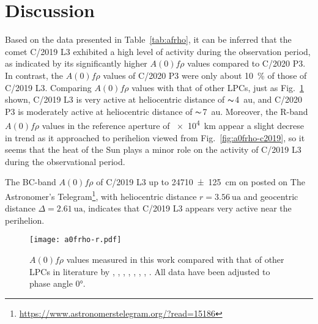 \section{Discussion}\label{sec:dis}


Based on the data presented in Table~\ref{tab:afrho}, it can be inferred that the comet C/2019 L3 exhibited a high level of activity during the observation period, as indicated by its significantly higher $A(0)f\rho$ values compared to C/2020 P3. In contrast, the $A(0)f\rho$ values of C/2020 P3 were only about \SI{10}{\percent} of those of C/2019 L3. 
Comparing $A(0)f\rho$ values with that of other LPCs, just as Fig.~\ref{fig:afrho-ref} shown, C/2019 L3 is very active at heliocentric distance of $\thicksim${\SI{4}{\astronomicalunit}}, and C/2020 P3 is moderately active at heliocentric distance of $\thicksim${\SI{7}{\astronomicalunit}}. 
Moreover, the R-band $A(0)f\rho$ values in the reference aperture of {\SI{e4}{\km}} appear a slight decrese in trend as it approached to perihelion viewed from Fig.~\ref{fig:a0frho-c2019}, so it seems that the heat of the Sun plays a minor role on the activity of C/2019 L3 during the observational period. %

The BC-band $A(0)f\rho$ of C/2019 L3 up to \SI{24710 +- 125}{\cm} on  posted on The Astronomer's Telegram\footnote{\href{https://www.astronomerstelegram.org/?read=15186}{https://www.astronomerstelegram.org/?read=15186}}, with heliocentric distance $r = \SI{3.56}{\astronomicalunit}$ and geocentric distance $\Delta = \SI{2.61}{\astronomicalunit}$, indicates that C/2019 L3 appears very active near the perihelion. 


\begin{figure}
    \centering
    \texttt{[image: a0frho-r.pdf]}
    \caption{$A(0)f\rho$ values measured in this work compared with that of other LPCs in  literature by \citet{mazzotta_epifani_observational_2014}, \citet{garcia_photometry_2021}, \citet{garcia_observational_2020}, \citet{rousselot_monitoring_2014}, \citet{meech_activity_2009}, \citet{sarneczky_activity_2016}, \citet{solontoi_ensemble_2012}, \citet{szabo_spectrophotometry_2002}. All data have been adjusted to phase angle \ang{0}. }\label{fig:afrho-ref}
\end{figure}%

